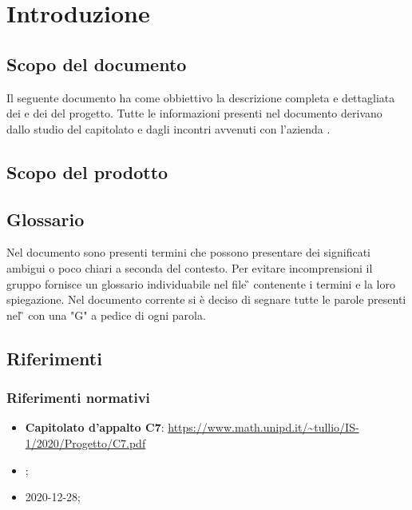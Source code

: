 \section{Introduzione}
\subsection{Scopo del documento}
Il seguente documento ha come obbiettivo la descrizione completa e dettagliata dei  e dei   del progetto. Tutte le informazioni presenti nel documento derivano dallo studio del capitolato e dagli incontri avvenuti con l'azienda .

\subsection{Scopo del prodotto}

\subsection{Glossario}
Nel documento sono presenti termini che possono presentare dei significati ambigui o poco chiari a seconda del contesto.
Per evitare incomprensioni il gruppo fornisce un glossario individuabile nel file \G{} \versGlo{} contenente i termini e la loro spiegazione.\newline{}
Nel documento corrente si è deciso di segnare tutte le parole presenti nel \G{} con una "G" a pedice di ogni parola.

\subsection{Riferimenti}
\subsubsection{Riferimenti normativi}
\begin{itemize}
\item \textbf{Capitolato d'appalto C7}:\newline
      \url{https://www.math.unipd.it/~tullio/IS-1/2020/Progetto/C7.pdf}
\item \NdP{} \versNdP ;
\item \VE{} 2020-12-28; %
\end{itemize}

